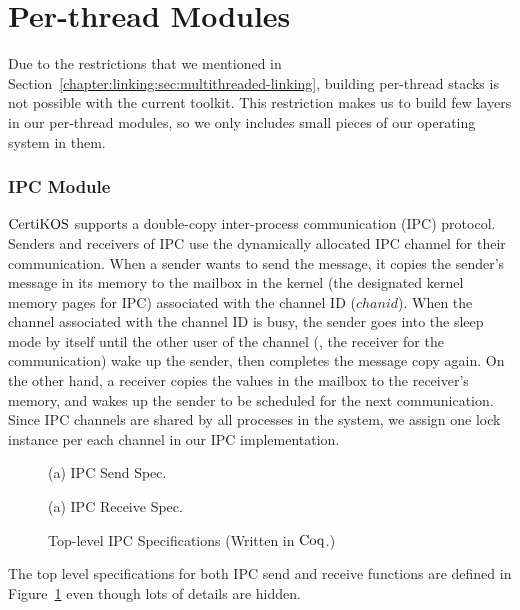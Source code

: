 \section{Per-thread Modules}
\label{chapter:certikos:sec:per-thread-modules}

Due to the restrictions that we mentioned in Section~\ref{chapter:linking:sec:multithreaded-linking},
building per-thread stacks is not possible with the current toolkit. 
This restriction makes us to build few layers in our per-thread modules,
so we only includes small pieces of our operating system in them.

\subsubsection{IPC Module}

$\mathrm{CertiKOS}$ supports a double-copy inter-process communication (IPC) protocol.
Senders and receivers of IPC use the dynamically allocated IPC channel for their communication. 
When a sender wants to send the message, 
it copies the sender's message in its memory to the mailbox in the kernel (the designated kernel memory pages for IPC) associated with the channel ID ($chanid$).
When the channel associated with the channel ID is busy, the sender goes into the sleep mode by itself until the other user of the channel
(\ie, the receiver for the communication) wake up the sender, then completes the message copy again. 
On the other hand, a receiver copies the values in the mailbox to the receiver's memory, and wakes up the sender to be scheduled 
for the next communication. 
Since IPC channels are shared by all processes in the system, 
we assign one lock instance per each channel in our IPC implementation.
 \begin{figure}
\begin{center}

(a) IPC Send Spec.
 
(a) IPC Receive Spec.
\end{center}
\caption{Top-level IPC Specifications (Written in $\mathrm{Coq}$.)}
\label{fig:chapter:certikos:ipc-specs}
\end{figure}
The top level specifications for both IPC send and receive functions are defined in Figure~\ref{fig:chapter:certikos:ipc-specs}
even though lots of details are hidden. 


